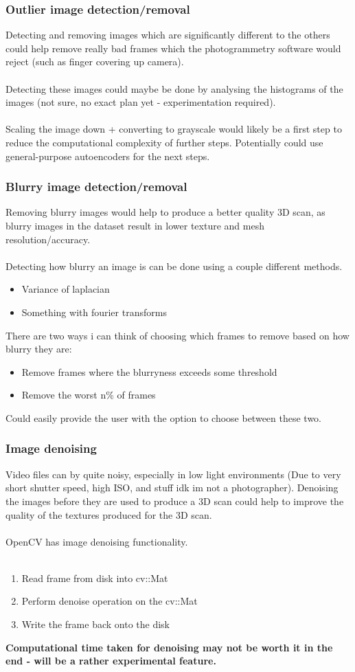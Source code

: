 \documentclass[11pt]{report}
\begin{document}
\subsubsection{Outlier image detection/removal}
Detecting and removing images which are significantly different to the others could help remove really bad frames which the photogrammetry software would reject (such as finger covering up camera).\\\\
Detecting these images could maybe be done by analysing the histograms of the images (not sure, no exact plan yet - experimentation required).\\\\
Scaling the image down + converting to grayscale would likely be a first step to reduce the computational complexity of further steps. Potentially could use general-purpose autoencoders for the next steps. 
\subsubsection{Blurry image detection/removal}
Removing blurry images would help to produce a better quality 3D scan, as blurry images in the dataset result in lower texture and mesh resolution/accuracy.\\\\
Detecting how blurry an image is can be done using a couple different methods.
\begin{itemize}
\item Variance of laplacian
\item Something with fourier transforms
\end{itemize}
There are two ways i can think of choosing which frames to remove based on how blurry they are:
\begin{itemize}
\item Remove frames where the blurryness exceeds some threshold
\item Remove the worst n\% of frames
\end{itemize}
Could easily provide the user with the option to choose between these two.
\subsubsection{Image denoising}
Video files can by quite noisy, especially in low light environments (Due to very short shutter speed, high ISO, and stuff idk im not a photographer). Denoising the images before they are used to produce a 3D scan could help to improve the quality of the textures produced for the 3D scan.\\\\
OpenCV has image denoising functionality.\\\\
\begin{enumerate}
\item Read frame from disk into cv::Mat
\item Perform denoise operation on the cv::Mat
\item Write the frame back onto the disk
\end{enumerate}
\textbf{Computational time taken for denoising may not be worth it in the end - will be a rather experimental feature.}
\end{document}
